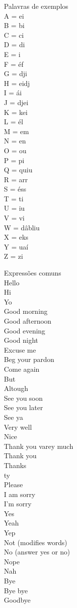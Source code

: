 \documentclass[12pt,a4paper]{article} %
\begin{document}
Palavras de exemplos\\
A = ei\\
B = bi\\
C = ci\\
D = di\\
E = i\\
F = éf\\
G = dji\\
H = eidj\\
I = ái\\
J = djei\\
K = kei\\
L = él\\
M = em\\
N = en\\
O = ou\\
P = pi\\
Q = quiu\\
R = arr\\
S = éss\\
T = ti\\
U = iu\\
V = vi\\
W = dâbliu\\
X = eks\\
Y = uaí\\
Z = zi

Expressões comuns\\
Hello\\
Hi\\
Yo\\
Good morning\\
Good afternoon\\
Good evening\\
Good night\\
Excuse me\\
Beg your pardon\\
Come again\\
But\\
Altough\\
See you soon\\
See you later\\
See ya\\
Very well\\
Nice\\
Thank you varey much\\
Thank you\\
Thanks\\
ty\\
Please\\
I am sorry\\
I'm sorry\\
Yes\\
Yeah\\
Yep\\
Not (modifies words)\\
No (answer yes or no)\\
Nope\\
Nah\\
Bye\\
Bye bye\\
Goodbye
\end{document}
